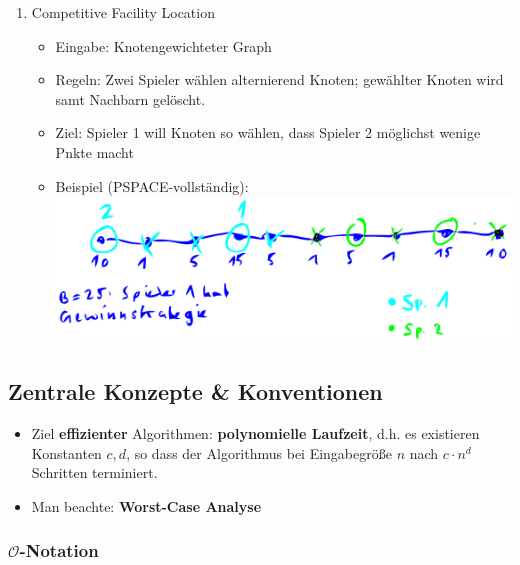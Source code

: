 \documentclass{scrartcl}
\begin{document}
\begin{enumerate}
\begin{itemize}
	\end{itemize}
	\item Competitive Facility Location
	\begin{itemize}
		\item Eingabe: Knotengewichteter Graph
		\item Regeln: Zwei Spieler wählen alternierend Knoten; gewählter Knoten wird samt Nachbarn gelöscht.
		\item Ziel: Spieler 1 will Knoten so wählen, dass Spieler 2 möglichst wenige Pnkte macht
		\item Beispiel (PSPACE-vollständig): \\
		\includegraphics[width=\linewidth]{figures/competitive-facility-location.pdf}
	\end{itemize}
\end{enumerate}

\subsection{Zentrale Konzepte \& Konventionen}

\begin{itemize}
	\item Ziel \textbf{effizienter} Algorithmen: \textbf{polynomielle Laufzeit}, d.h. es existieren Konstanten $ c,d $, so dass der Algorithmus bei Eingabegröße $ n $ nach $ c \cdot n^d $ Schritten terminiert.
	\item Man beachte: \textbf{Worst-Case Analyse}
\end{itemize}

\subsubsection{$ \mathcal{O} $-Notation}
\end{document}
